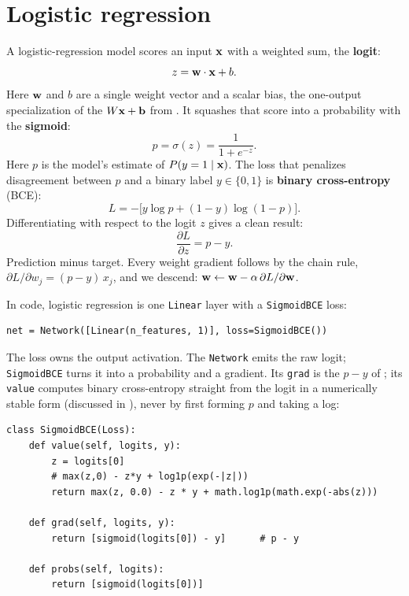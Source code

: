 
\section{Logistic regression}\label{sec:logistic}

A logistic-regression model scores an input $\mathbf{x}$ with a weighted sum,
the \textbf{logit}:
\[
  z = \mathbf{w} \cdot \mathbf{x} + b.
\]
Here $\mathbf{w}$ and $b$ are a single weight vector and a scalar bias, the
one-output specialization of the $W \mathbf{x} + \mathbf{b}$ from
. It squashes that score into a probability with
the \textbf{sigmoid}:
\[
  p = \sigma(z) = \frac{1}{1 + e^{-z}}.
\]
Here $p$ is the model's estimate of $P(y = 1 \mid \mathbf{x})$. The loss that
penalizes disagreement between $p$ and a binary label $y \in \{0, 1\}$
is \textbf{binary cross-entropy} (BCE):
\[
  L = -\bigl[y \log p + (1-y) \log(1-p)\bigr].
\]
Differentiating with respect to the logit $z$ gives a clean result:
\begin{equation}\label{eq:py-binary}
  \frac{\partial L}{\partial z} = p - y.
\end{equation}
Prediction minus target. Every weight gradient follows by the chain
rule, $\partial L / \partial w_j = (p - y)\, x_j$, and we descend:
$\mathbf{w} \leftarrow \mathbf{w} - \alpha\, \partial L / \partial \mathbf{w}$.

In code, logistic regression is one \texttt{Linear} layer with a
\texttt{SigmoidBCE} loss:
\begin{lstlisting}
net = Network([Linear(n_features, 1)], loss=SigmoidBCE())
\end{lstlisting}
The loss owns the output activation. The \texttt{Network} emits the raw
logit; \texttt{SigmoidBCE} turns it into a probability and a gradient.
Its \texttt{grad} is the $p - y$ of ; its
\texttt{value} computes binary cross-entropy straight from the logit in a
numerically stable form (discussed in ), never by
first forming $p$ and taking a log:

\begin{lstlisting}
class SigmoidBCE(Loss):
    def value(self, logits, y):
        z = logits[0]
        # max(z,0) - z*y + log1p(exp(-|z|))
        return max(z, 0.0) - z * y + math.log1p(math.exp(-abs(z)))

    def grad(self, logits, y):
        return [sigmoid(logits[0]) - y]      # p - y

    def probs(self, logits):
        return [sigmoid(logits[0])]
\end{lstlisting}

